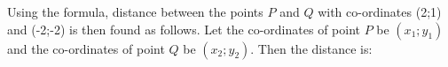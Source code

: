         \label{m39107*id67630}Using the formula, distance between the points \begin{math}P\end{math} and \begin{math}Q\end{math} with co-ordinates (2;1) and (-2;-2) is then found as follows. Let the co-ordinates of point \begin{math}P\end{math} be \begin{math}\left({x}_{1};{y}_{1}\right)\end{math} and the co-ordinates of point \begin{math}Q\end{math} be \begin{math}\left({x}_{2};{y}_{2}\right)\end{math}. Then the distance is:\par 
        \label{m39107*id67728}\nopagebreak\noindent{}
